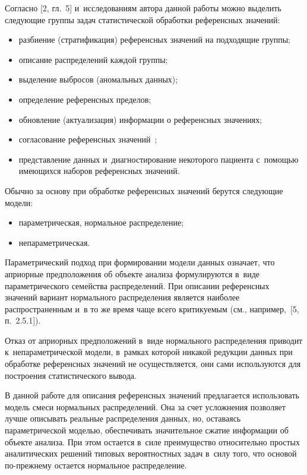 \begin{multicols}{2}
     Согласно [2, гл.~5] и~исследованиям автора данной работы
можно выделить следующие группы задач статистической обработки
референсных значений:
     \begin{itemize}
\item разбиение (стратификация) референсных значений на подходящие
группы;
\item описание распределений каждой группы;
\item выделение выбросов (аномальных данных);
\item определение референсных пределов;
\item обновление (актуализация) информации о референсных значениях;
\item согласование референсных значений~\cite{3-kri, 4-kri};
\item представление данных и~диагностирование некоторого пациента с~помощью имеющихся наборов референсных значений.
\end{itemize}

     Обычно за основу при обработке референсных значений берутся
следующие модели:
     \begin{itemize}
\item параметрическая, нормальное распределение;
\item непараметрическая.
\end{itemize}

     Параметрический подход при формировании модели данных означает,
что априорные предположения об объекте анализа формулируются в~виде
параметрического семейства распределений. При описании референсных
значений вариант нормального распределения является наиболее
распространенным и~в то же время чаще всего критикуемым (см.,
например,~[5, п.~2.5.1]).

     Отказ от априорных предположений в~виде нормального распределения
приводит к~непараметрической модели, в~рамках которой никакой редукции
данных при обработке референсных значений не осуществляется, они сами
используются для построения статистического вывода.

     В данной работе для описания референсных значений предлагается
использовать модель смеси нормальных распределений. Она за счет
усложнения позволяет лучше описывать реальные распределения данных, но,
оставаясь параметрической моделью, обеспечивать значительное сжатие
информации об объекте анализа. При этом остается в~силе преимущество
относительно простых аналитических решений типовых вероятностных задач в~силу того, что основой по-прежнему остается нормальное распределение.


\end{multicols}
